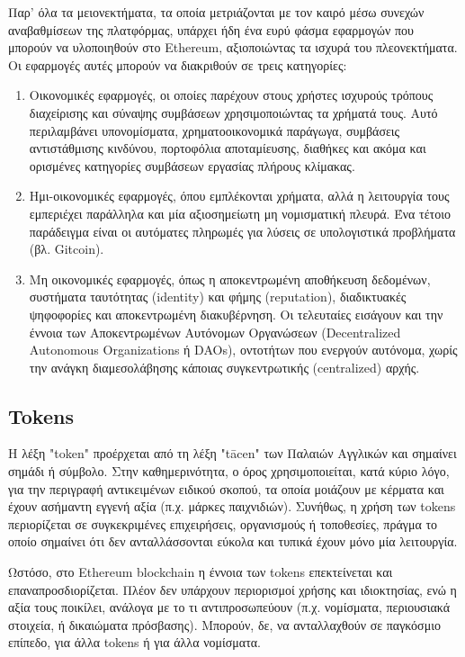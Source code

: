 Παρ' όλα τα μειονεκτήματα, τα οποία μετριάζονται με τον καιρό μέσω συνεχών αναβαθμίσεων της πλατφόρμας, υπάρχει ήδη ένα ευρύ φάσμα εφαρμογών που μπορούν να υλοποιηθούν στο Ethereum, αξιοποιώντας τα ισχυρά του πλεονεκτήματα. Οι εφαρμογές αυτές μπορούν να διακριθούν σε τρεις κατηγορίες:
\begin{enumerate}
	\item Οικονομικές εφαρμογές, οι οποίες παρέχουν στους χρήστες ισχυρούς τρόπους διαχείρισης και σύναψης συμβάσεων χρησιμοποιώντας τα χρήματά τους. Αυτό περιλαμβάνει υπονομίσματα, χρηματοοικονομικά παράγωγα, συμβάσεις αντιστάθμισης κινδύνου, πορτοφόλια αποταμίευσης, διαθήκες και ακόμα και ορισμένες κατηγορίες συμβάσεων εργασίας πλήρους κλίμακας.
	
	\item Ημι-οικονομικές εφαρμογές, όπου εμπλέκονται χρήματα, αλλά η λειτουργία τους εμπεριέχει παράλληλα και μία αξιοσημείωτη μη νομισματική πλευρά. Ένα τέτοιο παράδειγμα είναι οι αυτόματες πληρωμές για λύσεις σε υπολογιστικά προβλήματα (βλ. Gitcoin).
	
	\item Μη οικονομικές εφαρμογές, όπως η αποκεντρωμένη αποθήκευση δεδομένων, συστήματα ταυτότητας (identity) και φήμης (reputation), διαδικτυακές ψηφοφορίες και αποκεντρωμένη διακυβέρνηση. Οι τελευταίες εισάγουν και την έννοια των Αποκεντρωμένων Αυτόνομων Οργανώσεων (Decentralized Autonomous Organizations ή DAOs), οντοτήτων που ενεργούν αυτόνομα, χωρίς την ανάγκη διαμεσολάβησης κάποιας συγκεντρωτικής (\textenglish{centralized}) αρχής.\cite{2.6-ethereum-whitepaper}
\end{enumerate}

\subsection{Tokens}

Η λέξη "token" προέρχεται από τη λέξη "tācen" των Παλαιών Αγγλικών και σημαίνει σημάδι ή
σύμβολο. Στην καθημερινότητα, ο όρος χρησιμοποιείται, κατά κύριο λόγο, για την περιγραφή αντικειμένων ειδικού σκοπού, τα οποία μοιάζουν με κέρματα και έχουν ασήμαντη εγγενή αξία (π.χ. μάρκες παιχνιδιών). Συνήθως, η χρήση των tokens περιορίζεται σε συγκεκριμένες επιχειρήσεις, οργανισμούς ή τοποθεσίες, πράγμα το οποίο σημαίνει ότι δεν ανταλλάσσονται εύκολα και τυπικά έχουν μόνο μία λειτουργία.\cite{2.6-ethereum-mastering}

Ωστόσο, στο Ethereum blockchain η έννοια των tokens επεκτείνεται και επαναπροσδιορίζεται. Πλέον δεν υπάρχουν περιορισμοί χρήσης και ιδιοκτησίας, ενώ η αξία τους ποικίλει, ανάλογα με το τι αντιπροσωπεύουν (π.χ. νομίσματα, περιουσιακά στοιχεία, ή δικαιώματα πρόσβασης). Μπορούν, δε, να ανταλλαχθούν σε παγκόσμιο επίπεδο, για άλλα tokens ή για άλλα νομίσματα.

